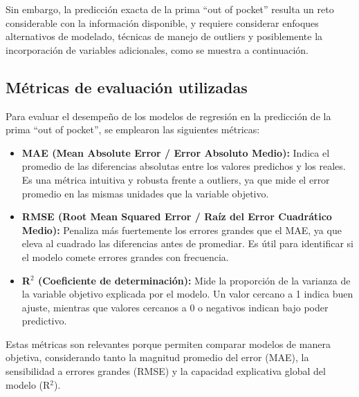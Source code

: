 \documentclass[12pt,a4paper]{article}
\begin{document}
\begin{itemize}
Sin embargo, la predicción exacta de la prima ``out of pocket'' resulta un reto considerable con la información disponible, y requiere considerar enfoques alternativos de modelado, técnicas de manejo de outliers y posiblemente la incorporación de variables adicionales, como se muestra a continuación.

\subsection*{Métricas de evaluación utilizadas}
Para evaluar el desempeño de los modelos de regresión en la predicción de la prima ``out of pocket'', se emplearon las siguientes métricas:
\begin{itemize}
    \item \textbf{MAE (Mean Absolute Error / Error Absoluto Medio):} Indica el promedio de las diferencias absolutas entre los valores predichos y los reales. Es una métrica intuitiva y robusta frente a outliers, ya que mide el error promedio en las mismas unidades que la variable objetivo.
    \item \textbf{RMSE (Root Mean Squared Error / Raíz del Error Cuadrático Medio):} Penaliza más fuertemente los errores grandes que el MAE, ya que eleva al cuadrado las diferencias antes de promediar. Es útil para identificar si el modelo comete errores grandes con frecuencia.
    \item \textbf{R$^2$ (Coeficiente de determinación):} Mide la proporción de la varianza de la variable objetivo explicada por el modelo. Un valor cercano a 1 indica buen ajuste, mientras que valores cercanos a 0 o negativos indican bajo poder predictivo.
\end{itemize}

Estas métricas son relevantes porque permiten comparar modelos de manera objetiva, considerando tanto la magnitud promedio del error (MAE), la sensibilidad a errores grandes (RMSE) y la capacidad explicativa global del modelo (R$^2$). 


\end{itemize}
\end{document}
